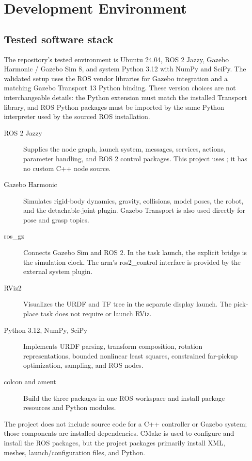 \chapter{Development Environment}
\label{ch:environment}

\section{Tested software stack}
The repository's tested environment is Ubuntu 24.04, ROS 2 Jazzy, Gazebo
Harmonic / Gazebo Sim 8, and system Python 3.12 with NumPy and SciPy. The
validated setup uses the ROS vendor libraries for Gazebo integration and a
matching Gazebo Transport 13 Python binding. These version choices are not
interchangeable details: the Python extension must match the installed
Transport library, and ROS Python packages must be imported by the same Python
interpreter used by the sourced ROS installation.

\begin{description}
 \item[ROS 2 Jazzy] Supplies the node graph, launch system, messages, services,
 actions, parameter handling, and ROS 2 control packages. This project uses
 ; it has no custom C++ node source.
 \item[Gazebo Harmonic] Simulates rigid-body dynamics, gravity, collisions,
 model poses, the robot, and the detachable-joint plugin. Gazebo Transport is
 also used directly for pose and grasp topics.
 \item[ros\_gz] Connects Gazebo Sim and ROS 2. In the task launch, the explicit
 bridge is the simulation clock. The arm's ros2\_control interface is provided
 by the external  system plugin.
 \item[RViz2] Visualizes the URDF and TF tree in the separate display launch.
 The pick-place task does not require or launch RViz.
 \item[Python 3.12, NumPy, SciPy] Implements URDF parsing, transform
 composition, rotation representations, bounded nonlinear least squares,
 constrained far-pickup optimization, sampling, and ROS nodes.
 \item[colcon and ament] Build the three packages in one ROS workspace and
 install package resources and Python modules.
\end{description}

The project does not include source code for a C++ controller or Gazebo system;
those components are installed dependencies. CMake is used to configure and
install the ROS packages, but the project packages primarily install XML,
meshes, launch/configuration files, and Python.

